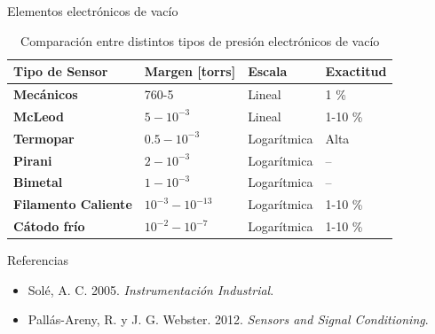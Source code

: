\documentclass[aspectratio=169]{beamer}
\begin{document}
\begin{frame}{Elementos electrónicos de vacío}
 \begin{table}[]
 \footnotesize
    \centering
    \begin{tabular}{m{3.2cm} m{1.2cm} m{1.5cm} m{1.9cm}}
        \toprule
        \textbf{Tipo de Sensor} & \textbf{Margen [torrs]} & \textbf{Escala} &\textbf{Exactitud}\\
        \midrule
        \textbf{Mecánicos} & 760-5 & Lineal & 1 \% \\
        \textbf{McLeod} & $5 - 10^{-3}$ & Lineal & 1-10 \% \\
        \textbf{Termopar} & $0.5 - 10^{-3}$ & Logarítmica & Alta\\
        \textbf{Pirani} & $2 - 10^{-3}$ & Logarítmica & -- \\
        \textbf{Bimetal} & $1 - 10^{-3}$ & Logarítmica & -- \\
        \textbf{Filamento Caliente} & $10^{-3} - 10^{-13}$ & Logarítmica & 1-10 \% \\
        \textbf{Cátodo frío} & $10^{-2} - 10^{-7}$ & Logarítmica & 1-10 \% \\
        \bottomrule
    \end{tabular}
    \caption{Comparación entre distintos tipos de presión electrónicos de vacío}
    \label{tab:Comparacionvacio}
\end{table}
\end{frame}


\begin{frame}{Referencias}
\footnotesize
\begin{itemize}
    \item Sol\'e, A. C. 2005. \emph{Instrumentaci\'on Industrial}.
    \item Pall\'as-Areny, R. y J. G. Webster. 2012. \emph{Sensors and Signal Conditioning}.
\end{itemize}
\end{frame}
\end{document}
